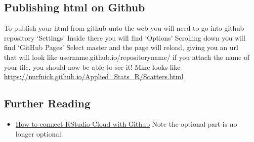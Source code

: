 \documentclass{exam}
\begin{document}
\subsection{Publishing html on Github}

To publish your html from github unto the web you will need to go into github repository `Settings'  Inside there you will find `Options'  Scrolling down you will find `GitHub Pages'  Select master and the page will reload, giving you an url that will look like username.github.io/repositoryname/ if you attach the name of your file, you should now be able to see it!  Mine looks like \url{https://nurfnick.github.io/Applied_Stats_R/Scatters.html} 

\subsection{Further Reading}
\begin{itemize}
\item \href{https://bren.zendesk.com/hc/en-us/articles/360015826731-How-to-connect-RStudio-Cloud-with-Github}{How to connect RStudio Cloud with Github} Note the optional part is no longer optional.
\end{itemize}
\end{document}
